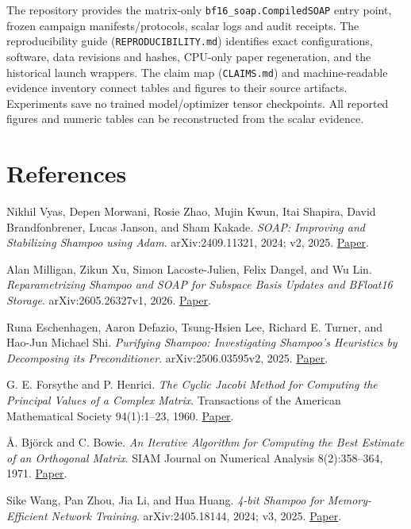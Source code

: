 \documentclass[
  10pt,
]{article}
\begin{document}
The repository provides the matrix-only \texttt{bf16\_soap.CompiledSOAP}
entry point, frozen campaign manifests/protocols, scalar logs and audit
receipts. The reproducibility guide (\texttt{REPRODUCIBILITY.md})
identifies exact configurations, software, data revisions and hashes,
CPU-only paper regeneration, and the historical launch wrappers. The
claim map (\texttt{CLAIMS.md}) and machine-readable evidence inventory
connect tables and figures to their source artifacts. Experiments save
no trained model/optimizer tensor checkpoints. All reported figures and
numeric tables can be reconstructed from the scalar evidence.

\hypertarget{references}{%
\section{References}\label{references}}

Nikhil Vyas, Depen Morwani, Rosie Zhao, Mujin Kwun, Itai Shapira, David
Brandfonbrener, Lucas Janson, and Sham Kakade. \emph{SOAP: Improving and
Stabilizing Shampoo using Adam}. arXiv:2409.11321, 2024; v2, 2025.
\href{https://arxiv.org/abs/2409.11321v2}{Paper}.

Alan Milligan, Zikun Xu, Simon Lacoste-Julien, Felix Dangel, and Wu Lin.
\emph{Reparametrizing Shampoo and SOAP for Subspace Basis Updates and
BFloat16 Storage}. arXiv:2605.26327v1, 2026.
\href{https://arxiv.org/abs/2605.26327v1}{Paper}.

Runa Eschenhagen, Aaron Defazio, Tsung-Hsien Lee, Richard E. Turner, and
Hao-Jun Michael Shi. \emph{Purifying Shampoo: Investigating Shampoo's
Heuristics by Decomposing its Preconditioner}. arXiv:2506.03595v2, 2025.
\href{https://arxiv.org/abs/2506.03595v2}{Paper}.

G. E. Forsythe and P. Henrici. \emph{The Cyclic Jacobi Method for
Computing the Principal Values of a Complex Matrix}. Transactions of the
American Mathematical Society 94(1):1--23, 1960.
\href{https://doi.org/10.2307/1993275}{Paper}.

Å. Björck and C. Bowie. \emph{An Iterative Algorithm for Computing the
Best Estimate of an Orthogonal Matrix}. SIAM Journal on Numerical
Analysis 8(2):358--364, 1971.
\href{https://doi.org/10.1137/0708036}{Paper}.

Sike Wang, Pan Zhou, Jia Li, and Hua Huang. \emph{4-bit Shampoo for
Memory-Efficient Network Training}. arXiv:2405.18144, 2024; v3, 2025.
\href{https://arxiv.org/abs/2405.18144v3}{Paper}.
\end{document}
